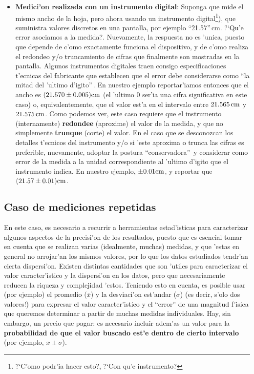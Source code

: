 \documentclass[letterpaper,11pt]{report}
\begin{document}
\begin{itemize}
\item \textbf{Medici'on realizada con un instrumento digital}: Suponga que mide el mismo ancho de la hoja, pero ahora usando un instrumento digital\footnote{?`C'omo podr'ia hacer esto?, ?`Con qu'e instrumento?}), que suministra valores discretos en una pantalla, por ejemplo ``21.57''\,cm. ?`Qu'e error asociamos a la medida?. Nuevamente, la respuesta no es 'unica, puesto que depende de c'omo exactamente funciona el dispositivo, y de c'omo realiza el redondeo y/o truncamiento de cifras que finalmente son mostradas en la pantalla. Algunos instrumentos digitales traen consigo especificaciones t'ecnicas del fabricante que establecen que el error debe considerarse como ``la mitad del 'ultimo d'igito''\,. En nuestro ejemplo reportar'iamos entonces que el ancho es $(21.570\pm 0.005)\rm cm$ (el 'ultimo 0 ser'ia una cifra significativa en este caso) o, equivalentemente, que el valor est'a en el intervalo entre $21.565\,\rm cm$ y $21.575\,\rm cm$. Como podemos ver, este caso requiere que el instrumento (internamente) \textbf{redondee} (aproxime) el valor de la medida, y que no simplemente \textbf{trunque} (corte) el valor. En el caso que se desconozcan los detalles t'ecnicos del instrumento y/o si 'este aproxima o trunca las cifras es preferible, nuevamente, adoptar la postura ``conservadora''\, y considerar como error de la medida a la unidad correspondiente al 'ultimo d'igito que el instrumento indica. En nuestro ejemplo, $\pm 0.01\rm cm$, y reportar que $(21.57\pm 0.01)\rm cm$.
\end{itemize}

\subsection{Caso de mediciones repetidas}

En este caso, es necesario a recurrir a herramientas estad'isticas para caracterizar algunos aspectos de la precisi'on de los resultados, puesto que es esencial tomar en cuenta que se realizan varias (idealmente, muchas) medidas, y que 'estas en general no arrojar'an los mismos valores, por lo que los datos estudiados tendr'an cierta dispersi'on. Existen distintas cantidades que son 'utiles para caracterizar el valor caracter'istico y la dispersi'on en los datos, pero que necesariamente reducen la riqueza y complejidad 'estos. Teniendo esto en cuenta, es posible usar (por ejemplo) el promedio ($\bar{x}$) y la desviaci'on est'andar ($\sigma$) (es decir, s'olo dos valores!) para expresar el valor caracter'istico y el ``error'' de una magnitud f'isica que queremos determinar a partir de muchas medidas individuales. Hay, sin embargo, un precio que pagar: es necesario incluir adem'as un valor para la \textbf{probabilidad de que el valor buscado est'e dentro de cierto intervalo} (por ejemplo, $\bar{x}\pm \sigma$).
\end{document}
